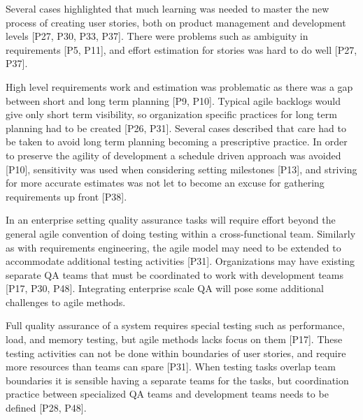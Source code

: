 \documentclass[preprint,authoryear,12pt]{elsarticle}
\begin{document}
Several cases highlighted that much learning was needed to master the new
process of creating user stories, both on product management and development
levels [P27, P30, P33, P37]. There were problems such as ambiguity in
requirements [P5, P11], and effort estimation for stories was hard to do well
[P27, P37].




High level requirements work and estimation was problematic as there was a gap
between short and long term planning [P9, P10]. Typical agile backlogs would
give only short term visibility, so organization specific practices for long
term planning had to be created [P26, P31]. Several cases described that care
had to be taken to avoid long term planning becoming a prescriptive practice. In
order to preserve the agility of development a schedule driven approach was
avoided [P10], sensitivity was used when considering setting milestones [P13],
and striving for more accurate estimates was not let to become an excuse for
gathering requirements up front [P38].


In an enterprise setting quality assurance tasks will require effort beyond the
general agile convention of doing testing within a cross-functional team.
Similarly as with requirements engineering, the agile model may need to be
extended to accommodate additional testing activities [P31]. Organizations may
have existing separate QA teams that must be coordinated to work with
development teams [P17, P30, P48]. Integrating enterprise scale QA will pose
some additional challenges to agile methods.

Full quality assurance of a system requires special testing such as performance,
load, and memory testing, but agile methods lacks focus on them [P17]. These
testing activities can not be done within boundaries of user stories, and
require more resources than teams can spare [P31]. When testing tasks overlap
team boundaries it is sensible having a separate teams for the tasks, but
coordination practice between specialized QA teams and development teams needs
to be defined [P28, P48].
\end{document}
